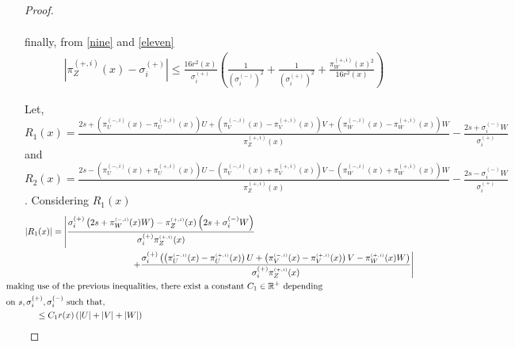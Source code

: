 \documentclass[12pt]{article}
\theoremstyle{Theorem}
\begin{document}
\begin{proof}
\begin{itemize}
\begin{align}
  \end{align}
 finally, from \eqref{nine} and \eqref{eleven}
  \begin{align}
  \left|\pi^{\scriptscriptstyle(+, i)}_{Z}(x) - \sigma^{(+)}_{i}\right| \leq \frac{16r^{2}(x)}{\sigma^{(+)}_{i}}\left(\frac{1}{(\sigma^{(-)}_{i})^{2}} + \frac{1}{(\sigma^{(+)}_{i})^{2}} +  \frac{\pi^{\scriptscriptstyle(+, i)}_{W}(x)^{2}}{16r^{2}(x)} \right)
  \end{align}
\end{itemize} 
Let, $R_{1}(x) = \frac{2s + \left( \pi^{\scriptscriptstyle(-, i)}_{U}(x)- \pi^{\scriptscriptstyle(+, i)}_{U}(x)\right) U + \left(\pi^{\scriptscriptstyle(-, i)}_{V}(x)- \pi^{\scriptscriptstyle(+, i)}_{V}(x)\right)V + \left(\pi^{\scriptscriptstyle(-, i)}_{W}(x) - \pi^{\scriptscriptstyle(+, i)}_{W}(x)\right) W}{\pi^{\scriptscriptstyle(+, i)}_{Z}(x)} - \frac{2s + \sigma^{\scriptscriptstyle (-)}_{i}W}{\sigma^{\scriptscriptstyle (+)}_{i}}$ and $ R_{2}(x) = \frac{2s - \left( \pi^{\scriptscriptstyle(-, i)}_{U}(x)+\pi^{\scriptscriptstyle(+, i)}_{U}(x)\right) U - \left(\pi^{\scriptscriptstyle(-, i)}_{V}(x)+\pi^{\scriptscriptstyle(+, i)}_{V}(x)\right)V - \left(\pi^{\scriptscriptstyle(-, i)}_{W}(x) +\pi^{\scriptscriptstyle(+, i)}_{W}(x)\right) W}{\pi^{\scriptscriptstyle(+, i)}_{Z}(x)} - \frac{2s - \sigma^{\scriptscriptstyle (-)}_{i}W}{\sigma^{\scriptscriptstyle (+)}_{i}} $. Considering $R_{1}(x)$
{\small
\begin{align*}
|R_{1}(x)| = \left|\frac{\sigma^{(+)}_{i}\left(2s + \pi^{\scriptscriptstyle(-, i)}_{W}(x) W\right) - \pi^{\scriptscriptstyle(+, i)}_{Z}(x)\left( 2s +  \sigma^{(-)}_{i}W\right)}{\sigma^{(+)}_{i}\pi^{\scriptscriptstyle(+, i)}_{Z}(x)} \right.\\
& \hspace{-5cm} \left. + \frac{\sigma^{(+)}_{i}\left(\left( \pi^{\scriptscriptstyle(-, i)}_{U}(x)- \pi^{\scriptscriptstyle(+, i)}_{U}(x)\right) U + \left(\pi^{\scriptscriptstyle(-, i)}_{V}(x)- \pi^{\scriptscriptstyle(+, i)}_{V}(x)\right)V - \pi^{\scriptscriptstyle(+, i)}_{W}(x) W \right)}{\sigma^{(+)}_{i}\pi^{\scriptscriptstyle(+, i)}_{Z}(x)}\right| \\
& \hspace{-10cm} \text{making use of the previous inequalities, there exist a constant $C_{1} \in \mathbb{R}^{+}$ depending}\\
& \hspace{-10cm}  \text{on $s, \sigma^{(+)}_{i}, \sigma^{(-)}_{i}$ such that,} \\
& \hspace{-8.8cm}\leq C_{1}r(x)\left(|U| + |V| + |W|\right)

\end{align*}}
\end{proof}
\end{document}
